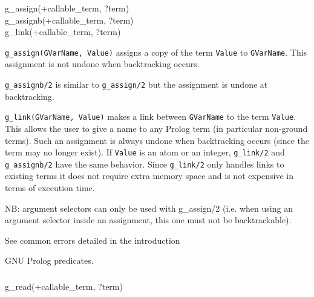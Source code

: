 \begin{TemplatesOneCol}
g\_assign(+callable\_term, ?term)\\
g\_assignb(+callable\_term, ?term)\\
g\_link(+callable\_term, ?term)

\end{TemplatesOneCol}

\Description

\texttt{g\_assign(GVarName, Value)} assigns a copy of the term
\texttt{Value} to \texttt{GVarName}. This assignment is not undone when
backtracking occurs.

\texttt{g\_assignb/2} is similar to \texttt{g\_assign/2} but the assignment
is undone at backtracking.

\texttt{g\_link(GVarName, Value)} makes a link between \texttt{GVarName} to
the term \texttt{Value}. This allows the user to give a name to any Prolog
term (in particular non-ground terms). Such an assignment is always undone
when backtracking occurs (since the term may no longer exist). If
\texttt{Value} is an atom or an integer, \texttt{g\_link/2} and
\texttt{g\_assignb/2} have the same behavior. Since \texttt{g\_link/2} only
handles links to existing terms it does not require extra memory space and
is not expensive in terms of execution time.

NB: argument selectors can only be used with {g\_assign/2} (i.e. when using
an argument selector inside an assignment, this one must not be
backtrackable).

\Errors

See common errors detailed in the introduction 

\begin{PlErrorsNoTitle}


\end{PlErrorsNoTitle}

\Portability

GNU Prolog predicates.

\subsubsection{}

\begin{TemplatesOneCol}
g\_read(+callable\_term, ?term)

\end{TemplatesOneCol}

